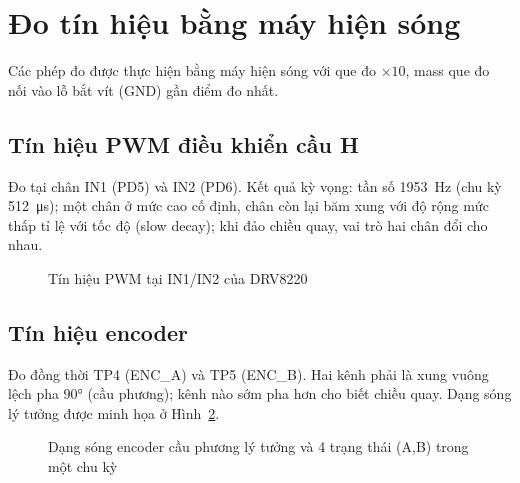 \section{Đo tín hiệu bằng máy hiện sóng}
\label{sec:oscillo}
Các phép đo được thực hiện bằng máy hiện sóng  với que đo $\times10$, mass que đo nối vào lỗ bắt vít (GND) gần điểm đo nhất.

\subsection{Tín hiệu PWM điều khiển cầu H}
Đo tại chân IN1 (PD5) và IN2 (PD6). Kết quả kỳ vọng: tần số \SI{1953}{\hertz} (chu kỳ \SI{512}{\micro\second}); một chân ở mức cao cố định, chân còn lại băm xung với độ rộng mức thấp tỉ lệ với tốc độ (slow decay); khi đảo chiều quay, vai trò hai chân đổi cho nhau.

\begin{figure}[H]
\centering
{}
\caption{Tín hiệu PWM tại IN1/IN2 của DRV8220}
\label{fig:osc_pwm}
\end{figure}

\subsection{Tín hiệu encoder}
Đo đồng thời TP4 (ENC\_A) và TP5 (ENC\_B). Hai kênh phải là xung vuông lệch pha \ang{90} (cầu phương); kênh nào sớm pha hơn cho biết chiều quay. Dạng sóng lý tưởng được minh họa ở Hình~\ref{fig:quad}.

\begin{figure}[H]
\centering
{}
\caption{Dạng sóng encoder cầu phương lý tưởng và 4 trạng thái (A,B) trong một chu kỳ}
\label{fig:quad}
\end{figure}

